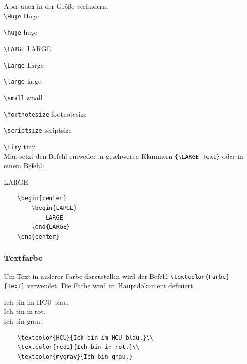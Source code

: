 Aber auch in der Größe verändern:\\

\verb|\Huge| \hfill {\Huge Huge}

\verb|\huge| \hfill {\huge huge}

\verb|\LARGE| \hfill {\LARGE LARGE}

\verb|\Large| \hfill {\Large Large}

\verb|\large| \hfill {\large large}

\verb|\small| \hfill {\small small}

\verb|\footnotesize| \hfill {\footnotesize footnotesize}

\verb|\scriptsize| \hfill {\scriptsize scriptsize}

\verb|\tiny| \hfill {\tiny tiny}\\

Man setzt den Befehl entweder in geschweifte Klammern \verb|{\LARGE Text}| oder in einem Befehl:

\begin{center}
    \begin{LARGE}
        LARGE
    \end{LARGE}
\end{center}


\begin{verbatim}
    \begin{center}
        \begin{LARGE}
            LARGE
        \end{LARGE}
    \end{center}
\end{verbatim}

\pagebreak
\subsubsection{Textfarbe}

Um Text in anderer Farbe darzustellen wird der Befehl \verb|\textcolor{Farbe}{Text}| verwendet. Die Farbe wird im Hauptdokument definiert.

\textcolor{HCU}{Ich bin im HCU-blau.}\\
\textcolor{red1}{Ich bin in rot.}\\
\textcolor{mygray}{Ich bin grau.}

\begin{verbatim}
    \textcolor{HCU}{Ich bin im HCU-blau.}\\
    \textcolor{red1}{Ich bin in rot.}\\
    \textcolor{mygray}{Ich bin grau.}
\end{verbatim}

